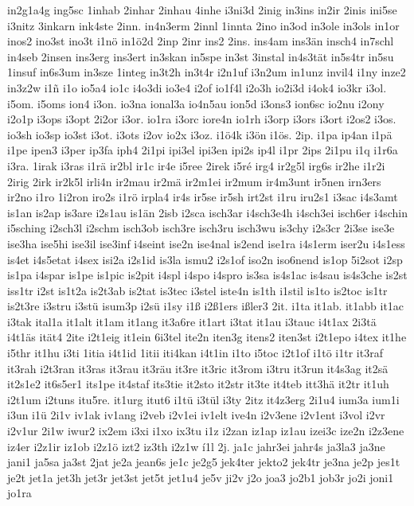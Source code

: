 {in2g1a4g
ing5sc
1inhab
2inhar
2inhau
4inhe
i3ni3d
2inig
in3ins
in2ir
2inis
ini5se
i3nitz
3inkarn
ink4ste
2inn.
in4n3erm
2innl
1innta
2ino
in3od
in3ole
in3ols
in1or
inos2
ino3st
ino3t
i1nö
in1ö2d
2inp
2inr
ins2
2ins.
ins4am
ins3än
insch4
in7schl
in4seb
2insen
ins3erg
ins3ert
in3skan
in5spe
in3st
3instal
in4s3tät
in5s4tr
in5su
1insuf
in6s3um
in3sze
1integ
in3t2h
in3t4r
i2n1uf
i3n2um
in1unz
invil4
i1ny
inze2
in3z2w
i1ñ
i1o
io5a4
io1c
i4o3di
io3e4
i2of
io1f4l
i2o3h
io2i3d
i4ok4
io3kr
i3ol.
i5om.
i5oms
ion4
i3on.
io3na
ional3a
io4n5au
ion5d
i3ons3
ion6sc
io2nu
i2ony
i2o1p
i3ops
i3opt
2i2or
i3or.
io1ra
i3orc
iore4n
io1rh
i3orp
i3ors
i3ort
i2os2
i3os.
io3sh
io3sp
io3st
i3ot.
i3ots
i2ov
io2x
i3oz.
i1ö4k
i3ön
i1ös.
2ip.
i1pa
ip4an
i1pä
i1pe
ipen3
i3per
ip3fa
iph4
2i1pi
ipi3el
ipi3en
ipi2s
ip4l
i1pr
2ips
2i1pu
i1q
i1r6a
i3ra.
1irak
i3ras
i1rä
ir2bl
ir1c
ir4e
i5ree
2irek
i5ré
irg4
ir2g5l
irg6s
ir2he
i1r2i
2irig
2irk
ir2k5l
irli4n
ir2mau
ir2mä
ir2m1ei
ir2mum
ir4m3unt
ir5nen
irn3ers
ir2no
i1ro
1i2ron
iro2s
i1rö
irpla4
ir4s
ir5se
ir5sh
irt2st
i1ru
iru2s1
i3sac
i4s3amt
is1an
is2ap
is3are
i2s1au
is1än
2isb
i2sca
isch3ar
i4sch3e4h
i4sch3ei
isch6er
i4schin
i5sching
i2sch3l
i2schm
isch3ob
isch3re
isch3ru
isch3wu
is3chy
i2s3cr
2i3se
ise3e
ise3ha
ise5hi
ise3il
ise3inf
i4seint
ise2n
ise4nal
is2end
ise1ra
i4s1erm
iser2u
i4s1ess
is4et
i4s5etat
i4sex
isi2a
i2s1id
is3la
ismu2
i2s1of
iso2n
iso6nend
is1op
5i2sot
i2sp
is1pa
i4spar
is1pe
is1pic
is2pit
i4spl
i4spo
i4spro
is3sa
is4s1ac
is4sau
is4s3che
is2st
iss1tr
i2st
is1t2a
is2t3ab
is2tat
is3tec
i3stel
iste4n
is1th
i1stil
is1to
is2toc
is1tr
is2t3re
i3stru
i3stü
isum3p
i2sü
i1sy
i1ß
i2ß1ers
ißler3
2it.
i1ta
it1ab.
it1abb
it1ac
i3tak
ital1a
it1alt
it1am
it1ang
it3a6re
it1art
i3tat
it1au
i3tauc
i4t1ax
2i3tä
i4t1äs
ität4
2ite
i2t1eig
it1ein
6i3tel
ite2n
iten3g
itens2
iten3st
i2t1epo
i4tex
it1he
i5thr
it1hu
i3ti
1itia
i4t1id
1itii
iti4kan
i4t1in
i1to
i5toc
i2t1of
i1tö
i1tr
it3raf
it3rah
i2t3ran
it3ras
it3rau
it3räu
it3re
it3ric
it3rom
i3tru
it3run
it4s3ag
it2sä
it2s1e2
it6s5er1
its1pe
it4staf
its3tie
it2sto
it2str
it3te
it4teb
itt3hä
it2tr
it1uh
i2t1um
i2tuns
itu5re.
it1urg
itut6
i1tü
i3tül
i3ty
2itz
it4z3erg
2i1u4
ium3a
ium1i
i3un
i1ü
2i1v
iv1ak
iv1ang
i2veb
i2v1ei
iv1elt
ive4n
i2v3ene
i2v1ent
i3vol
i2vr
i2v1ur
2i1w
iwur2
ix2em
i3xi
i1xo
ix3tu
i1z
i2zan
iz1ap
iz1au
izei3c
ize2n
i2z3ene
iz4er
i2z1ir
iz1ob
i2z1ö
izt2
iz3th
i2z1w
í1l
2j.
ja1c
jahr3ei
jahr4s
ja3la3
ja3ne
jani1
ja5sa
ja3st
2jat
je2a
jean6s
je1c
je2g5
jek4ter
jekto2
jek4tr
je3na
je2p
jes1t
je2t
jet1a
jet3h
jet3r
jet3st
jet5t
jet1u4
je5v
ji2v
j2o
joa3
jo2b1
job3r
jo2i
joni1
jo1ra
}
